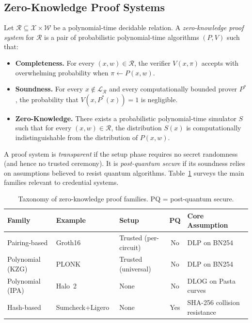 \subsection{Zero-Knowledge Proof Systems}\label{sec:bg-zkp}

\begin{definition}\label{def:zkp}
Let $\mathcal{R} \subseteq \mathcal{X} \times \mathcal{W}$ be a
polynomial-time decidable relation.  A \emph{zero-knowledge proof system} for
$\mathcal{R}$ is a pair of probabilistic polynomial-time algorithms
$(P, V)$ such that:
\begin{itemize}
  \item \textbf{Completeness.}  For every $(x, w) \in \mathcal{R}$, the
        verifier $V(x, \pi)$ accepts with overwhelming probability when
        $\pi \leftarrow P(x, w)$.
  \item \textbf{Soundness.}  For every $x \notin \mathcal{L}_\mathcal{R}$
        and every computationally bounded prover $P^*$, the probability that
        $V(x, P^*(x)) = 1$ is negligible.
  \item \textbf{Zero-Knowledge.}  There exists a probabilistic
        polynomial-time simulator $S$ such that for every $(x, w) \in
        \mathcal{R}$, the distribution $S(x)$ is computationally
        indistinguishable from the distribution of $P(x, w)$.
\end{itemize}
\end{definition}

\noindent
A proof system is \emph{transparent} if the setup phase requires no secret
randomness (and hence no trusted ceremony).  It is \emph{post-quantum secure}
if its soundness relies on assumptions believed to resist quantum algorithms.
Table~\ref{tab:zk-families} surveys the main families relevant to credential
systems.

\begin{table}[t]
  \centering
  \caption{Taxonomy of zero-knowledge proof families. PQ = post-quantum secure.}
  \label{tab:zk-families}
  \small
  \setlength{\tabcolsep}{4pt}
  \begin{tabular}{@{}lllcp{3.5cm}@{}}
    \toprule
    Family & Example & Setup & PQ & Core Assumption \\
    \midrule
    Pairing-based    & Groth16~\cite{groth16}
                     & Trusted (per-circuit)  & No
                     & DLP on BN254 \\
    Polynomial (KZG) & PLONK~\cite{plonk}
                     & Trusted (universal)    & No
                     & DLP on BN254 \\
    Polynomial (IPA) & Halo~2~\cite{halo2}
                     & None                   & No
                     & DLOG on Pasta curves \\
    Hash-based       & Sumcheck+Ligero~\cite{ligero,sumcheck}
                     & None                   & Yes
                     & SHA-256 collision resistance \\
    \bottomrule
  \end{tabular}
\end{table}

